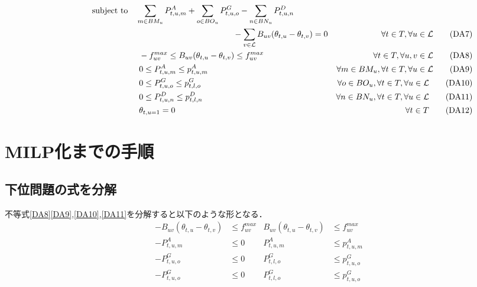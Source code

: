 \documentclass[a4j,10.5pt,fleqn]{jarticle}
\begin{document}
\begin{align}
&\hspace{20mm}{\rm subject\,\,to}\quad \sum_{m\in BM_u}P^{A}_{t,u,m}+\sum_{o\in BO_u}P^{G}_{t,u,o}-\sum_{n\in BN_u}P^{D}_{t,u,n}\notag \\
&\hspace{80mm}-\sum_{v\in \mathcal{L}}B_{uv}(\theta_{t,u}-\theta_{t,v})=0& \forall t\in T, \forall u \in \mathcal{L}\label{DA7}\tag{DA7}\\
&\hspace{40mm}-f^{max}_{uv} \leq B_{uv}(\theta_{t,u}-\theta_{t,v}) \leq f^{max}_{uv}& \forall t\in T, \forall u,v \in \mathcal{L}\label{DA8}\tag{DA8}\\
&\hspace{40mm}0\leq P^{A}_{t,u,m} \leq p^{A}_{t,u,m}& \forall m\in BM_u, \forall t\in T,\forall u \in \mathcal{L}\label{DA9}\tag{DA9}\\
&\hspace{40mm}0\leq P^{G}_{t,u,o}\leq p^{G}_{t,l,o}& \forall o\in BO_u, \forall t\in T, \forall u \in \mathcal{L}\label{DA10}\tag{DA10}\\
&\hspace{40mm}0\leq P^{D}_{t,u,n} \leq p^{D}_{t,l,n}& \forall n\in BN_u, \forall t\in T, \forall u \in \mathcal{L}\label{DA11}\tag{DA11}\\
&\hspace{40mm}\theta_{t,u=1}=0&\forall t\in T\label{DA12}\tag{DA12}
\end{align}
\newpage
\section{MILP化までの手順}
\subsection{下位問題の式を分解}
不等式\ref{DA8}\ref{DA9},\ref{DA10},\ref{DA11}を分解すると以下のような形となる．
\begin{align}
-B_{uv}(\theta_{t,u}-\theta_{t,v})&\le f_{uv}^{max}&B_{uv}(\theta_{t,u}-\theta_{t,v})&\le f_{uv}^{max}\label{1}\\
-P_{t,u,m}^{A}&\le 0&P_{t,u,m}^{A}&\le p_{t,u,m}^{A}\label{2}\\
-P_{t,u,o}^{G}&\le 0&P_{t,l,o}^{G}&\le p_{t,u,o}^{G}\label{3}\\
-P_{t,u,o}^{G}&\le 0&P_{t,l,o}^{G}&\le p_{t,u,o}^{G}\label{4}
\end{align}
\end{document}
